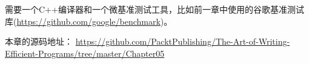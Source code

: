 需要一个C++编译器和一个微基准测试工具，比如前一章中使用的谷歌基准测试库(\url{https://github.com/google/benchmark})。

本章的源码地址： \url{https://github.com/PacktPublishing/The-Art-of-Writing-Efficient-Programs/tree/master/Chapter05}